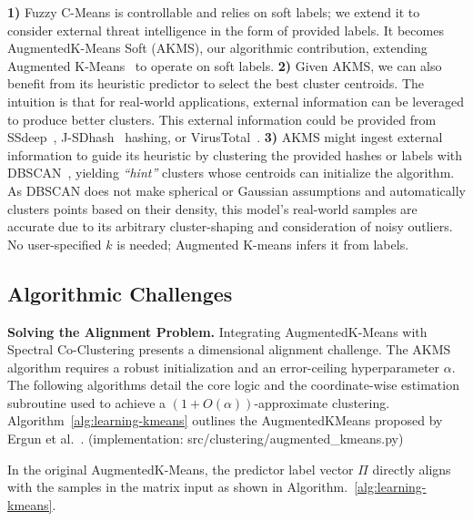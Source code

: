 \noindent \textbf{1)} Fuzzy C-Means is controllable and relies on soft labels; we extend it to consider external threat intelligence in the form of provided labels. It becomes AugmentedK-Means Soft (AKMS), our algorithmic contribution, extending Augmented K-Means~\cite{ergun2022_learningaugmentedkmeansclustering} to operate on soft labels.\newline
\noindent \textbf{2)} Given AKMS, we can also benefit from its heuristic predictor to select the best cluster centroids. The intuition is that for real-world applications, external information can be leveraged to produce better clusters. This external information could be provided from SSdeep~\cite{KORNBLUM200691_ssdeep}, J-SDhash~\cite{botacin2021_ssdeephashing} hashing, or VirusTotal~\cite{virustotal}. \newline
\noindent \textbf{3)}
AKMS might ingest external information to guide its heuristic by clustering the provided hashes or labels with DBSCAN~\cite{ester1996_DBSCAN}, yielding \textit{``hint''} clusters whose centroids can initialize the algorithm. As DBSCAN does not make spherical or Gaussian assumptions and automatically clusters points based on their density, this model's real-world samples are accurate due to its arbitrary cluster-shaping and consideration of noisy outliers. No user-specified $k$ is needed; Augmented K-means infers it from labels.

\vspace{-2.0mm}

\subsection{Algorithmic Challenges}
\label{subsec:algChal}

\noindent \textbf{Solving the Alignment Problem.}  In\-te\-grat\-ing Aug\-ment\-edK-Means with Spectral Co-Clustering presents a dimensional alignment challenge. The AKMS algorithm requires a robust initialization and an error-ceiling hyperparameter $\alpha$. The following algorithms detail the core logic and the coordinate-wise estimation subroutine used to achieve a $(1 + O(\alpha))$-approximate clustering. Algorithm~\ref{alg:learning-kmeans} outlines the AugmentedKMeans proposed by Ergun et al.~\cite{ergun2022_learningaugmentedkmeansclustering}.
(implementation: src/clustering/augmented\_kmeans.py)

In the original AugmentedK-Means, the predictor label vector $\Pi$ directly aligns with the samples in the matrix input as shown in Algorithm.~\ref{alg:learning-kmeans}.

